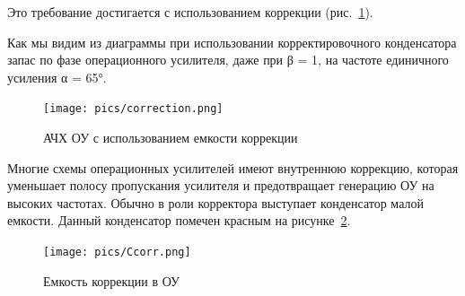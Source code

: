 \documentclass[a4paper,12pt,oneside]{scrartcl}
\begin{document}
Это требование достигается с использованием коррекции (рис.~\ref{fig:Corr}).

Как мы видим из диаграммы при использовании корректировочного конденсатора запас по фазе операционного усилителя, даже при β = 1, на частоте единичного усиления α = 65°.

\begin{figure}[!htb]
\centering
\texttt{[image: pics/correction.png]}
\caption{АЧХ ОУ с использованием емкости коррекции}
\label{fig:Corr}
\end{figure}
\FloatBarrier

Многие схемы операционных усилителей имеют внутреннюю коррекцию, которая уменьшает полосу пропускания усилителя и предотвращает генерацию ОУ на высоких частотах. Обычно в роли корректора выступает конденсатор малой емкости. Данный конденсатор помечен красным на рисунке~\ref{fig:Ccorr}.

\begin{figure}[!htb]
\centering
\texttt{[image: pics/Ccorr.png]}
\caption{Емкость коррекции в ОУ}
\label{fig:Ccorr}
\end{figure}
\end{document}
